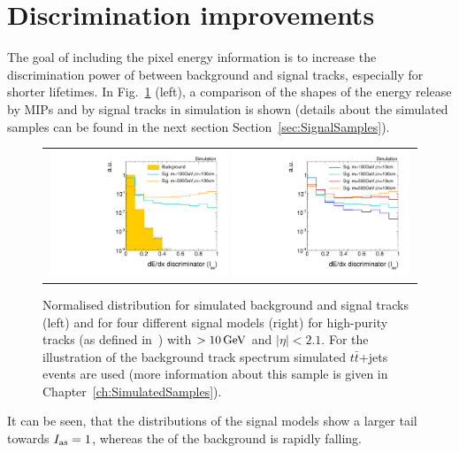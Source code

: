 \section{Discrimination improvements}
\label{sec:DiscriminationImprovements}
The goal of including the pixel energy information is to increase the discrimination power of \ias between background and signal tracks, especially for shorter lifetimes.
In Fig.~\ref{fig:MIPs-Signal-Dedx} (left), a comparison of the shapes of the energy release by MIPs and by signal tracks in simulation is shown (details about the simulated samples can be found in the next section Section~\ref{sec:SignalSamples}).
\begin{figure}[!t]
  \centering 
  \begin{tabular}{c}
    \includegraphics[width=0.49\textwidth]{figures/analysis_2/PixelCalibration/htrackASmiSmallRange_log_chiTracksGoodQualitySelection_2Signal_ttjets.pdf}   
    \includegraphics[width=0.49\textwidth]{figures/analysis_2/PixelCalibration/htrackASmiSmallRange_log_chiTracksGoodQualitySelection_4Signal.pdf}
  \end{tabular}
  \caption{Normalised \ias distribution for simulated background and signal tracks (left) and for four different signal models (right) 
           for high-purity tracks (as defined in~\cite{bib:CMS:Tracking_2010}) with \pt$>10\,\text{Ge}\kern-0.06667em\text{V}$ and $|\eta|<2.1$.
           For the illustration of the background track spectrum simulated $t\bar{t}$+jets events are used (more information about this sample is given in Chapter~\ref{ch:SimulatedSamples}).}
  \label{fig:MIPs-Signal-Dedx}
\end{figure} 
It can be seen, that the \ias distributions of the signal models show a larger tail towards $I_{\text{as}}=1$, whereas the \ias of the background is rapidly falling.

